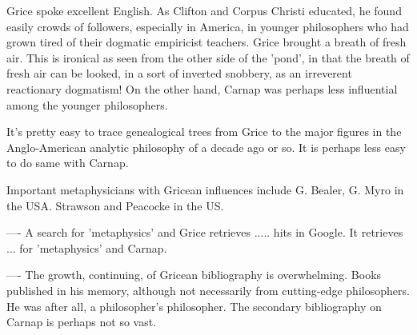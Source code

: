 \documentclass[10pt,titlepage]{book}
\begin{document}
Grice spoke excellent English. As Clifton and Corpus Christi educated, he  
found easily crowds of followers, especially in America, in younger 
philosophers  who had grown tired of their dogmatic empiricist teachers. Grice 
brought a  breath of fresh air. This is ironical as seen from the other side of 
the 'pond',  in that the breath of fresh air can be looked, in a sort of 
inverted snobbery,  as an irreverent reactionary dogmatism!  On the other hand, 
Carnap was  perhaps less influential among the younger philosophers. 
 
It's pretty easy to trace genealogical trees from Grice to the major  
figures in the Anglo-American analytic philosophy of a decade ago or so. It is  
perhaps less easy to do same with Carnap.
 
Important metaphysicians with Gricean influences include G. Bealer, G. Myro 
 in the USA. Strawson and Peacocke in the US.
 
---- A search for 'metaphysics' and Grice retrieves ..... hits in Google.  
It retrieves ... for 'metaphysics' and Carnap.
 
 
 
---- The growth, continuing, of Gricean bibliography is overwhelming. Books 
 published in his memory, although not necessarily from cutting-edge  
philosophers. He was after all, a philosopher's philosopher. The secondary  
bibliography on Carnap is perhaps not so vast.
\end{document}
